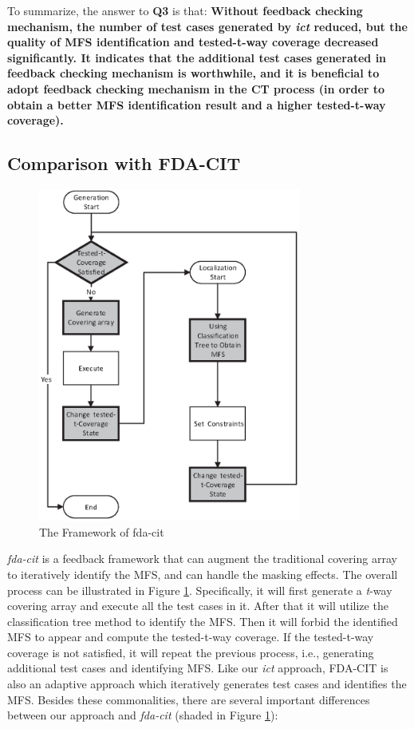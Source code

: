 \documentclass[10pt,journal,compsoc]{IEEEtran}
\begin{document}
{To summarize, the answer to \textbf{Q3} is that:
\textbf{Without feedback  checking mechanism, the number of test cases generated by \emph{ict} reduced, but the quality of MFS identification and tested-t-way coverage decreased significantly. It indicates that the additional test cases generated in feedback  checking mechanism is worthwhile, and it is beneficial to adopt feedback checking mechanism in the CT process (in order to obtain a better MFS identification result and a higher tested-t-way coverage).
}
%
}

\subsection{Comparison with FDA-CIT}\label{sec:emprical:CompareFDA}
\begin{figure}[ht]
 \includegraphics[width=3.4in]{fd-cit.eps}
\caption{The Framework of fda-cit}
\label{fda-cit-life}
\end{figure}
\emph{fda-cit} \cite{yilmaz2013reducing} is a feedback framework that can augment the traditional covering array to iteratively identify the MFS, and can handle the masking effects. The overall process can be illustrated in Figure \ref{fda-cit-life}. Specifically, it will first generate a \emph{t}-way covering array and execute all the test cases in it. After that it will utilize the classification tree method to identify the MFS. Then it will forbid the identified MFS to appear and compute the tested-t-way coverage. If the tested-t-way coverage is not satisfied, it will repeat the previous process, i.e., generating additional test cases and identifying MFS. Like our \emph{ict} approach, FDA-CIT is also an adaptive approach which iteratively generates test cases and identifies the MFS. Besides these commonalities, there are several important differences between our approach and \emph{fda-cit} (shaded in Figure \ref{fda-cit-life}):
\end{document}
